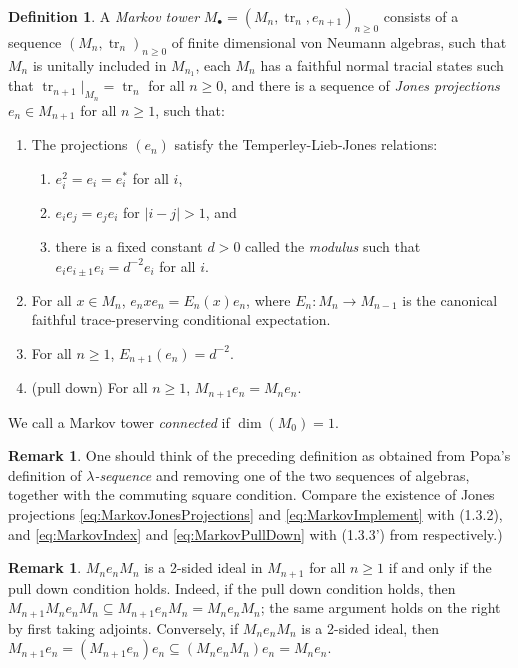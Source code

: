 \documentclass[11pt]{article}
\theoremstyle{plain}
\theoremstyle{definition}
\newtheorem{defn}[thm]{Definition}
\newtheorem{rem}[thm]{Remark}
\DeclareMathOperator{\tr}{tr}
\begin{document}
\begin{defn}
A \emph{Markov tower} $M_\bullet = (M_n, \tr_n, e_{n+1})_{n\geq 0}$ consists of a sequence $(M_n, \tr_n)_{n\geq 0}$ of finite dimensional von Neumann algebras, such that $M_n$ is unitally included in $M_{n_1}$, each $M_n$ has a faithful normal tracial states such that $\tr_{n+1}|_{M_n} = \tr_n$ for all $n\geq 0$, and there is a sequence of \emph{Jones projections} $e_n \in M_{n+1}$ for all $n\geq 1$, such that:
\begin{enumerate}[label={\rm(M\arabic*)}]
\item
\label{eq:MarkovJonesProjections}
The projections $(e_n)$ satisfy the Temperley-Lieb-Jones relations:
\begin{enumerate}[label={\rm(\alph*)}]
\item
$e_i^2 = e_i = e_i^*$ for all $i$,
\item
$e_i e_j = e_j e_i$ for $|i-j|>1$, and
\item
there is a fixed constant $d>0$ called the \emph{modulus} such that $e_{i} e_{i\pm 1} e_i = d^{-2} e_i$ for all $i$.
\end{enumerate}
\item
\label{eq:MarkovImplement}
For all $x\in M_n$, $e_n x e_n = E_n(x)e_n$, where $E_n: M_n \to M_{n-1}$ is the canonical faithful trace-preserving conditional expectation.
\item
\label{eq:MarkovIndex}
For all $n\geq 1$, $E_{n+1}(e_n) = d^{-2}$.
\item
\label{eq:MarkovPullDown}
(pull down)
For all $n\geq 1$, $M_{n+1}e_n = M_n e_n$.
\end{enumerate}
We call a Markov tower \emph{connected} if $\dim(M_0) = 1$.
\end{defn}

\begin{rem}
One should think of the preceding definition as obtained from Popa's definition of \emph{$\lambda$-sequence} \cite{MR1334479} and removing one of the two sequences of algebras, together with the commuting square condition.
Compare the existence of Jones projections \ref{eq:MarkovJonesProjections} and \ref{eq:MarkovImplement} with (1.3.2), and \ref{eq:MarkovIndex} and \ref{eq:MarkovPullDown} with (1.3.3') from \cite{MR1334479} respectively.)
\end{rem}


\begin{rem}\label{pulldowniff}
$M_n e_n M_n$ is a 2-sided ideal in $M_{n+1}$ for all $n\geq 1$ if and only if the pull down condition holds. Indeed, if the pull down condition holds, then $M_{n+1} M_n e_n M_n \subseteq M_{n+1} e_n M_n = M_n e_n M_n$; the same argument holds on the right by first taking adjoints. Conversely, if $M_n e_n M_n$ is a 2-sided ideal, then $M_{n+1} e_n = (M_{n+1} e_n)e_n \subseteq (M_n e_n M_n) e_n = M_n e_n$.
\end{rem}
\end{document}
